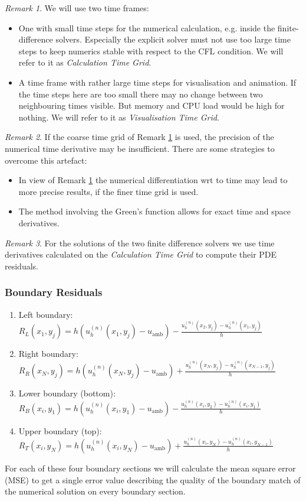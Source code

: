 \documentclass[a4paper,11pt]{article}
\theoremstyle{plain} %
\theoremstyle{definition} %
\theoremstyle{remark} %
\newtheorem{remark}{Remark}[section]
\theoremstyle{remark}
\begin{document}
\begin{remark} \label{two_t_frames}
We will use two time frames: 
\begin{itemize}
\item
One with small time steps for the numerical calculation, e.g. inside the finite-difference solvers. Especially the explicit solver must not use too large time steps to keep numerics stable with respect to the CFL condition. We will refer to it as \emph{Calculation Time Grid}.
\item
A time frame with rather large time steps for visualisation and animation. If the time steps here are too small there may no change between two neighbouring times visible. But memory and CPU load would be high for nothing. We will refer to it as \emph{Visualisation Time Grid}.
\end{itemize}
\end{remark}
\begin{remark} \label{numerical_dt}
If the coarse time grid of Remark \ref{two_t_frames} is used, the precision of the numerical time derivative may be insufficient. There are some strategies to overcome this artefact:
\begin{itemize}
\item
In view of Remark \ref{two_t_frames} the numerical differentiation wrt to time may lead to more precise results, if the finer time grid is used.
\item
The method involving the Green's function allows for exact time and space derivatives.
\end{itemize}
\end{remark}
%
\begin{remark}
For the solutions of the two finite difference solvers we use time derivatives calculated on the \emph{Calculation Time Grid} to compute their PDE residuals.
\end{remark}

\subsubsection*{Boundary Residuals}
\begin{enumerate}
\item Left boundary: $ R_L (x_1,y_j) = h (u_h^{(n)} (x_1,y_j)  - u_{\mathrm{amb}}) - \frac{u_h^{(n)} (x_2,y_j) - u_h^{(n)} (x_1,y_j) }{h} $
\item Right boundary: $ R_R (x_N,y_j) = h (u_h^{(n)} (x_N,y_j)- u_{\mathrm{amb}}) + \frac{u_h^{(n)} (x_N,y_j) - u_h^{(n)} (x_{N-1},y_j) }{h} $
\item Lower boundary (bottom): $ R_B (x_i,y_1) = h (u_h^{(n)} (x_i,y_1) - u_{\mathrm{amb}}) - \tfrac{u_h^{(n)} (x_i,y_2) - u_h^{(n)} (x_i,y_1) }{h} $
\item Upper boundary (top): $ R_T (x_i,y_N) = h (u_h^{(n)} (x_i,y_N) - u_{\mathrm{amb}}) + \frac{u_h^{(n)} (x_i,y_N) - u_h^{(n)} (x_i,y_{N-1}) }{h} $
\end{enumerate}
For each of these four boundary sections we will calculate the mean square error (MSE) to get a single error value describing the quality of the boundary match of the numerical solution on every boundary section. 
 
\end{document}
